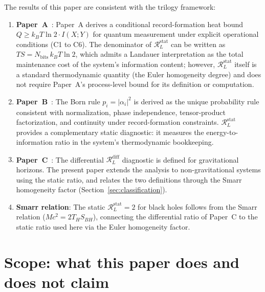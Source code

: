 \documentclass[%
 aip,
 amsmath,amssymb,
 reprint,%
]{revtex4-2}
\newcommand{\RLs}{\mathcal{R}_L^{\mathrm{stat}}}
\newcommand{\RLd}{\mathcal{R}_L^{\mathrm{diff}}}
\begin{document}
The results of this paper are consistent with the trilogy framework:

\begin{enumerate}
\item \textbf{Paper~A}~\cite{Rahnama2026A}: Paper~A derives a
conditional record-formation heat bound
$Q \geq k_B T \ln 2 \cdot I(X;Y)$ for quantum measurement under
explicit operational conditions (C1 to C6).  The denominator of
$\RLs$ can be written as $TS = N_{\mathrm{bits}}\,k_B T \ln 2$,
which admits a Landauer interpretation as the total maintenance cost
of the system's information content; however, $\RLs$ itself is a
standard thermodynamic quantity (the Euler homogeneity degree) and
does not require Paper~A's process-level bound for its definition
or computation.

\item \textbf{Paper~B}~\cite{Rahnama2026BornRule}: The Born rule
$p_i = |\alpha_i|^2$ is derived as the unique probability rule
consistent with normalization, phase independence, tensor-product
factorization, and continuity under record-formation constraints.
$\RLs$ provides a complementary static diagnostic: it measures
the energy-to-information ratio in the system's thermodynamic
bookkeeping.

\item \textbf{Paper~C}~\cite{Rahnama2026BlackHole}: The differential
$\RLd$ diagnostic is defined for gravitational horizons.
The present paper extends the analysis to non-gravitational
systems using the static ratio, and relates the two definitions
through the Smarr homogeneity factor
(Section~\ref{sec:classification}).

\item \textbf{Smarr relation}: The static $\RLs = 2$ for black
holes follows from the Smarr relation ($Mc^2 = 2T_H S_{BH}$),
connecting the differential ratio of Paper~C to the static ratio
used here via the Euler homogeneity factor.
\end{enumerate}


\section{Scope: what this paper does and does not claim}
\label{sec:scope}
\end{document}

